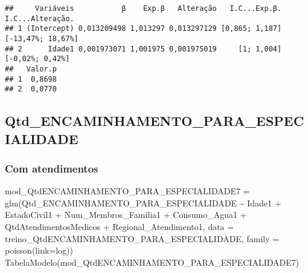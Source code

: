 \documentclass[
]{article}
\newenvironment{Shaded}{\begin{snugshade}}{\end{snugshade}}
\newcommand{\AttributeTok}[1]{\textcolor[rgb]{0.77,0.63,0.00}{#1}}
\newcommand{\FunctionTok}[1]{\textcolor[rgb]{0.00,0.00,0.00}{#1}}
\newcommand{\NormalTok}[1]{#1}
\newcommand{\OtherTok}[1]{\textcolor[rgb]{0.56,0.35,0.01}{#1}}
\newcommand{\SpecialCharTok}[1]{\textcolor[rgb]{0.00,0.00,0.00}{#1}}
\newcommand{\StringTok}[1]{\textcolor[rgb]{0.31,0.60,0.02}{#1}}
\begin{document}
\begin{verbatim}
##     Variáveis           β    Exp.β   Alteração   I.C...Exp.β.  I.C...Alteração.
## 1 (Intercept) 0,013209498 1,013297 0,013297129 [0,865; 1,187] [-13,47%; 18,67%]
## 2      Idade1 0,001973071 1,001975 0,001975019     [1; 1,004]   [-0,02%; 0,42%]
##   Valor.p
## 1  0,8698
## 2  0,0770
\end{verbatim}

\hypertarget{qtd_encaminhamento_para_especialidade}{%
\subsection{Qtd\_ENCAMINHAMENTO\_PARA\_ESPECIALIDADE}\label{qtd_encaminhamento_para_especialidade}}

\hypertarget{com-atendimentos-3}{%
\subsubsection{Com atendimentos}\label{com-atendimentos-3}}

\begin{Shaded}
\begin{Highlighting}[]
\NormalTok{mod\_QtdENCAMINHAMENTO\_PARA\_ESPECIALIDADE7 }\OtherTok{=} 
  \FunctionTok{glm}\NormalTok{(Qtd\_ENCAMINHAMENTO\_PARA\_ESPECIALIDADE }\SpecialCharTok{\textasciitilde{}}\NormalTok{ Idade1 }\SpecialCharTok{+}\NormalTok{ EstadoCivil1 }\SpecialCharTok{+}\NormalTok{ Num\_Membros\_Familia1 }\SpecialCharTok{+} 
\NormalTok{        Consumo\_Agua1 }\SpecialCharTok{+} 
\NormalTok{        QtdAtendimentosMedicos }\SpecialCharTok{+}\NormalTok{ Regional\_Atendimento1, }\AttributeTok{data =}\NormalTok{ treino\_QtdENCAMINHAMENTO\_PARA\_ESPECIALIDADE, }\AttributeTok{family =} \FunctionTok{poisson}\NormalTok{(}\AttributeTok{link=}\StringTok{\textquotesingle{}log\textquotesingle{}}\NormalTok{))}
\FunctionTok{TabelaModelo}\NormalTok{(mod\_QtdENCAMINHAMENTO\_PARA\_ESPECIALIDADE7)}
\end{Highlighting}
\end{Shaded}
\end{document}
